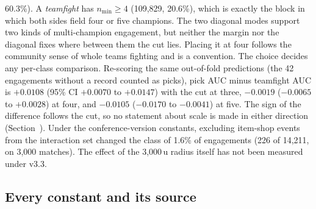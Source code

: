 60.3\%). A \emph{teamfight} has $n_{\min} \geq 4$ (109,829, 20.6\%), which is exactly the block in which
both sides field four or five champions.
The two diagonal modes support two kinds of multi-champion engagement, but neither the margin nor the
diagonal fixes where between them the cut lies. Placing it at four follows the community sense of whole
teams fighting and is a convention. The choice decides any per-class comparison. Re-scoring the same
out-of-fold predictions (the 42 engagements without a record counted as picks), pick AUC minus
teamfight AUC is $+0.0108$ (95\% CI $+0.0070$ to $+0.0147$) with the cut at three, $-0.0019$ ($-0.0065$
to $+0.0028$) at four, and $-0.0105$ ($-0.0170$ to $-0.0041$) at five. The sign of the difference
follows the cut, so no statement about scale is made in either direction
(Section~).
Under the conference-version constants, excluding item-shop events from the interaction set changed the
class of 1.6\% of engagements (226 of 14,211, on 3,000 matches). The effect of the 3,000\,u radius itself
has not been measured under v3.3.

\subsection{Every constant and its source}\label{sec:def-constants}

